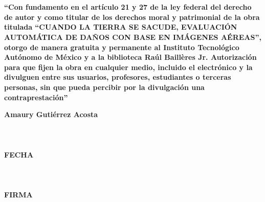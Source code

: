 \begin{titlepage}

\hfill\\
\hfill\\


\vspace{4cm}

\textbf{ ``Con fundamento en el art\'iculo 21 y 27 de la ley federal del derecho de autor y como titular de los derechos moral y patrimonial de la obra titulada ``CUANDO LA TIERRA SE SACUDE, EVALUACI\'ON AUTOM\'ATICA DE DA\~NOS CON BASE EN IM\'AGENES A\'EREAS'', otorgo de manera gratuita y permanente al Instituto Tecnol\'ogico Aut\'onomo de M\'exico y a la biblioteca Ra\'ul Baill\`eres Jr. Autorizaci\'on para que fijen la obra en cualquier medio, incluido el electr\'onico y la divulguen entre sus usuarios, profesores, estudiantes o terceras personas, sin que pueda percibir por la divulgaci\'on una contraprestaci\'on''}

\vspace{1cm}
\begin{center}
\textbf{Amaury Guti\'errez Acosta}\\
\hfill\\
\hfill\\
\makebox[2in]{\hrulefill}\\
\textbf{FECHA}\\
\hfill\\
\hfill\\
\makebox[2in]{\hrulefill}\\
\textbf{FIRMA}\\
\end{center}
\medskip




\end{titlepage}
\endinput